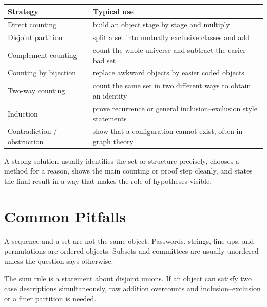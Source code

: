 \documentclass[12pt]{article}
\begin{document}
\begin{center}
\small
\begin{tabular}{@{}p{}p{}@{}}
\toprule
\textbf{Strategy} & \textbf{Typical use} \\
\midrule
Direct counting & build an object stage by stage and multiply \\
Disjoint partition & split a set into mutually exclusive classes and add \\
Complement counting & count the whole universe and subtract the easier bad set \\
Counting by bijection & replace awkward objects by easier coded objects \\
Two-way counting & count the same set in two different ways to obtain an identity \\
Induction & prove recurrence or general inclusion--exclusion style statements \\
Contradiction / obstruction & show that a configuration cannot exist, often in graph theory \\
\bottomrule
\end{tabular}
\end{center}

\begin{examtip}[title={What a polished MH1301 solution usually contains}]
A strong solution usually identifies the set or structure precisely, chooses a method for a reason, shows the main counting or proof step cleanly, and states the final result in a way that makes the role of hypotheses visible.
\end{examtip}

\section{Common Pitfalls}

\begin{commonmistake}[title={Order versus no order}]
A sequence and a set are not the same object. Passwords, strings, line-ups, and permutations are ordered objects. Subsets and committees are usually unordered unless the question says otherwise.
\end{commonmistake}

\begin{commonmistake}[title={Applying the sum rule without disjointness}]
The sum rule is a statement about disjoint unions. If an object can satisfy two case descriptions simultaneously, raw addition overcounts and inclusion--exclusion or a finer partition is needed.
\end{commonmistake}
\end{document}

